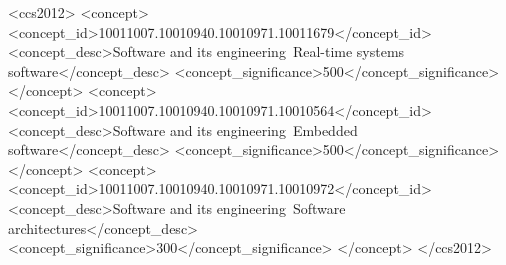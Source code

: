 \documentclass[sigconf, screen]{acmart}
\begin{document}
\begin{CCSXML}
<ccs2012>
   <concept>
       <concept_id>10011007.10010940.10010971.10011679</concept_id>
       <concept_desc>Software and its engineering~Real-time systems software</concept_desc>
       <concept_significance>500</concept_significance>
       </concept>
   <concept>
       <concept_id>10011007.10010940.10010971.10010564</concept_id>
       <concept_desc>Software and its engineering~Embedded software</concept_desc>
       <concept_significance>500</concept_significance>
       </concept>
   <concept>
       <concept_id>10011007.10010940.10010971.10010972</concept_id>
       <concept_desc>Software and its engineering~Software architectures</concept_desc>
       <concept_significance>300</concept_significance>
       </concept>
 </ccs2012>
\end{CCSXML}




\maketitle
\end{document}
